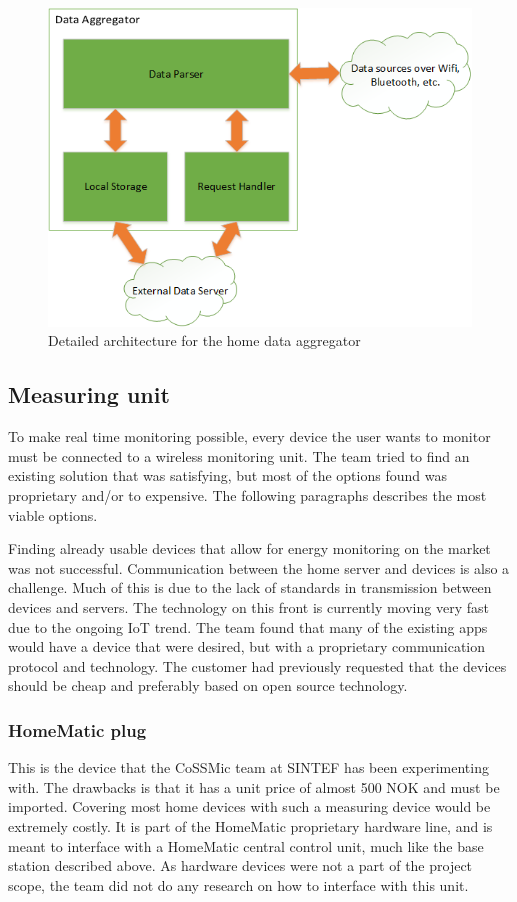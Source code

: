 \begin{figure}[H]
\centering
\includegraphics[height=0.4\textheight]{ch/further/fig/home.png}
\caption{Detailed architecture for the home data aggregator}
\label{fig:aggregator}
\end{figure}

\subsection{Measuring unit}
To make real time monitoring possible, every device the user wants to monitor must be connected to a wireless monitoring unit. The team tried to find an existing solution that was satisfying, but most of the options found was proprietary and/or to expensive. The following paragraphs describes the most viable options.

Finding already usable devices that allow for energy monitoring on the market was not successful. Communication between the home server and devices is also a challenge. Much of this is due to the lack of standards in transmission between devices and servers. The technology on this front is currently moving very fast due to the ongoing \gls{IoT} trend. The team found that many of the existing apps would have a device that were desired, but with a proprietary communication protocol and technology. The customer had previously requested that the devices should be cheap and preferably based on open source technology.

\subsubsection{HomeMatic plug}
This is the device that the CoSSMic team at SINTEF has been experimenting with. The drawbacks is that it has a unit price of almost 500 NOK and must be imported. Covering most home devices with such a measuring device would be extremely costly. It is part of the HomeMatic proprietary hardware line, and is meant to interface with a HomeMatic central control unit, much like the base station described above. As hardware devices were not a part of the project scope, the team did not do any research on how to interface with this unit. %

